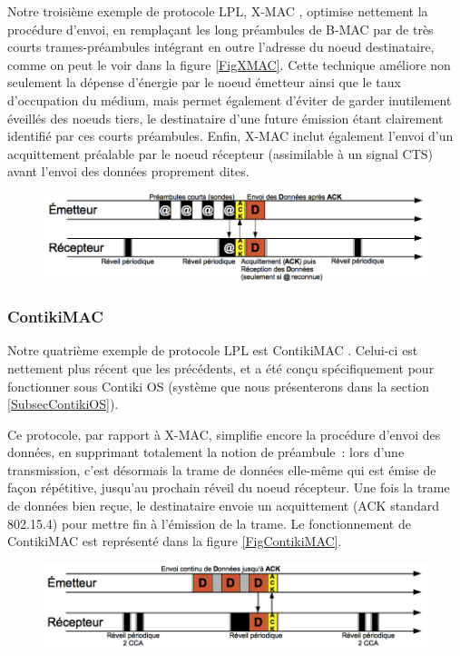 Notre troisième exemple de protocole LPL, X-MAC \cite{XMAC}, optimise
nettement la procédure d'envoi, en remplaçant les long préambules de B-MAC
par de très courts trames-préambules intégrant en outre l'adresse du
noeud destinataire, comme on peut le voir dans la figure \vref{FigXMAC}.
Cette technique améliore non seulement la dépense d'énergie par le noeud
émetteur ainsi que le taux d'occupation du médium, mais permet également
d'éviter de garder inutilement éveillés des noeuds tiers, le destinataire
d'une future émission étant clairement identifié par ces courts préambules.
Enfin, X-MAC inclut également l'envoi d'un acquittement préalable par le
noeud récepteur (assimilable à un signal CTS) avant l'envoi des données
proprement dites. 

\begin{figure}[!hbt]
\centering
\includegraphics[width=12.75cm]{images/ch3-x-mac.png}
\label{FigXMAC}
\end{figure}

\subsubsection{ContikiMAC}
\label{ParContikiMAC}

Notre quatrième exemple de protocole LPL est ContikiMAC \cite{ContikiMAC}.
Celui-ci est nettement plus récent que les précédents, et a été conçu
spécifiquement pour fonctionner sous Contiki OS (système que nous
présenterons dans la section \vref{SubsecContikiOS}).

Ce protocole, par rapport à X-MAC, simplifie encore la procédure d'envoi
des données, en supprimant totalement la notion de préambule~: lors d'une
transmission, c'est désormais la trame de données elle-même qui est
émise de façon répétitive, jusqu'au prochain réveil du noeud récepteur.
Une fois la trame de données bien reçue, le destinataire envoie un
acquittement (ACK standard 802.15.4) pour mettre fin à l'émission de la
trame. Le fonctionnement de ContikiMAC est représenté
dans la figure \vref{FigContikiMAC}.

\begin{figure}[!hbt]
\centering
\includegraphics[width=12.75cm]{images/ch3-contikimac.png}
\label{FigContikiMAC}
\end{figure}

